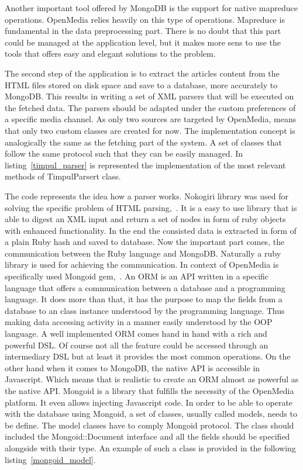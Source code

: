 Another important tool offered by MongoDB is the support for native mapreduce operations. OpenMedia relies heavily on this type of operations. Mapreduce is fundamental in the data preprocessing part. There is no doubt that this part could be managed at the application level, but it makes more sens to use the tools that offers easy and elegant solutions to the problem.

The second step of the application is to extract the articles content from the HTML files stored on disk space and save to a database, more accurately to MongoDB. This results in writing a set of XML parsers that will be executed on the fetched data. The parsers should be adapted under the custom preferences of a specific media channel. As only two sources are targeted by OpenMedia, means that only two custom classes are created for now. The implementation concept is analogically the same as the fetching part of the system. A set of classes that follow the same protocol such that they can be easily managed. In \mbox{listing \ref{timpul_parser}} is represented the implementation of the most relevant methods of TimpulParsert class.



The code represents the idea how a parser works. Nokogiri library was used for solving the specific problem of HTML \mbox{parsing, \cite{nokogiri_gem}}. It is a easy to use library that is able to digest an XML input and return a set of nodes in form of ruby objects with enhanced functionality. In the end the consisted data is extracted in form of a plain Ruby hash and saved to database. Now the important part comes, the communication between the Ruby language and MongoDB. Naturally a ruby library is used for achieving the communication. In context of OpenMedia is specifically used Mongoid \mbox{gem, \cite{mongoid_gem}}. An ORM is an API written in a specific language that offers a communication between a database and a programming language. It does more than that, it has the purpose to map the fields from a database to an class instance understood by the programming language. Thus making data accessing activity in a manner easily understood by the OOP language. A well implemented ORM comes hand in hand with a rich and powerful DSL. Of course not all the feature could be accessed through an intermediary DSL but at least it provides the most common operations. On the other hand when it comes to MongoDB, the native API is accessible in Javascript. Which means that is realistic to create an ORM almost as powerful as the native API. Mongoid is a library that fulfills the necessity of the OpenMedia platform. It even allows injecting Javascript code. In order to be able to operate with the database using Mongoid, a set of classes, usually called models, needs to be define. The model classes have to comply Mongoid protocol. The class should included the Mongoid::Document interface and all the fields should be specified alongside with their type. An example of such a class is provided in the following \mbox{listing \ref{mongoid_model}}.

